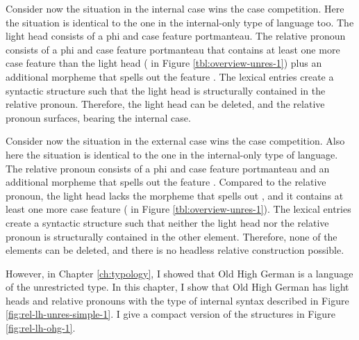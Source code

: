 Consider now the situation in the internal case wins the case competition. Here the situation is identical to the one in the internal-only type of language too. The light head consists of a phi and case feature portmanteau. The relative pronoun consists of a phi and case feature portmanteau that contains at least one more case feature than the light head ( in Figure \ref{tbl:overview-unres-1}) plus an additional morpheme that spells out the feature . The lexical entries create a syntactic structure such that the light head is structurally contained in the relative pronoun. Therefore, the light head can be deleted, and the relative pronoun surfaces, bearing the internal case.

Consider now the situation in the external case wins the case competition. Also here the situation is identical to the one in the internal-only type of language. The relative pronoun consists of a phi and case feature portmanteau and an additional morpheme that spells out the feature . Compared to the relative pronoun, the light head lacks the morpheme that spells out , and it contains at least one more case feature ( in Figure \ref{tbl:overview-unres-1}). The lexical entries create a syntactic structure such that neither the light head nor the relative pronoun is structurally contained in the other element. Therefore, none of the elements can be deleted, and there is no headless relative construction possible.

However, in Chapter \ref{ch:typology}, I showed that Old High German is a language of the unrestricted type. In this chapter, I show that Old High German has light heads and relative pronouns with the type of internal syntax described in Figure \ref{fig:rel-lh-unres-simple-1}. I give a compact version of the structures in Figure \ref{fig:rel-lh-ohg-1}.

